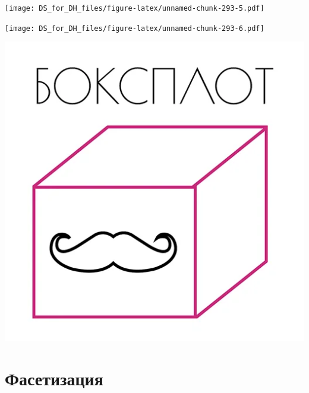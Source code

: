 \documentclass[
]{book}
\newenvironment{Shaded}{\begin{snugshade}}{\end{snugshade}}
\newcommand{\KeywordTok}[1]{\textcolor[rgb]{0.13,0.29,0.53}{\textbf{#1}}}
\newcommand{\NormalTok}[1]{#1}
\newcommand{\OperatorTok}[1]{\textcolor[rgb]{0.81,0.36,0.00}{\textbf{#1}}}
\newcommand{\StringTok}[1]{\textcolor[rgb]{0.31,0.60,0.02}{#1}}
\begin{document}
\begin{Shaded}
\end{Shaded}

\texttt{[image: DS\_for\_DH\_files/figure-latex/unnamed-chunk-293-5.pdf]}

\begin{Shaded}
\end{Shaded}

\texttt{[image: DS\_for\_DH\_files/figure-latex/unnamed-chunk-293-6.pdf]}

\includegraphics{images/boxplot.png}

\hypertarget{ux444ux430ux441ux435ux442ux438ux437ux430ux446ux438ux44f}{%
\section{Фасетизация}\label{ux444ux430ux441ux435ux442ux438ux437ux430ux446ux438ux44f}}
\end{document}

